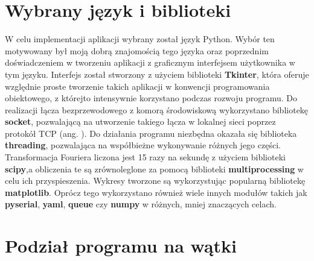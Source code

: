 \section{Wybrany język i biblioteki} \label{aplikacja_implementacja}

W celu implementacji aplikacji wybrany został język Python. Wybór ten motywowany był moją dobrą znajomością tego języka oraz poprzednim doświadczeniem w tworzeniu aplikacji z graficznym interfejsem użytkownika w tym języku. Interfejs został stworzony z użyciem biblioteki \textbf{Tkinter}, która oferuje względnie proste tworzenie takich aplikacji w konwencji programowania obiektowego, z której\linebreak to intensywnie korzystano podczas rozwoju programu. Do realizacji łącza bezprzewodowego z komorą środowiskową wykorzystano bibliotekę \textbf{socket}, pozwalającą na utworzenie takiego łącza w lokalnej sieci poprzez protokół TCP (ang. ). Do działania programu niezbędna okazała się biblioteka \textbf{threading}, pozwalająca na współbieżne wykonywanie różnych jego części. Transformacja Fouriera liczona jest 15 razy na sekundę z użyciem biblioteki \textbf{scipy},\linebreak a obliczenia te są zrównoleglone za pomocą biblioteki \textbf{multiprocessing} w celu ich przyspieszenia. Wykresy tworzone są wykorzystując popularną bibliotekę \textbf{matplotlib}. Oprócz tego wykorzystano również wiele innych modułów takich jak \textbf{pyserial}, \textbf{yaml}, \textbf{queue} czy \textbf{numpy} w różnych, mniej znaczących celach.

\section{Podział programu na wątki} \label{watki}

